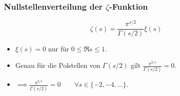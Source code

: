\begin{frame}[label=current]
    \frametitle{Nullstellenverteilung der $\zeta$-Funktion}
    \[
        \zeta(s) = \frac{\pi^{s/2}}{\Gamma(s/2)}\xi(s)  
    \]
    \begin{itemize}
        \item<2-> $\xi(s) = 0$ nur für $0 \leq \Re s \leq 1$.
        \item<3-> Genau für die Polstellen von $\Gamma(s/2)$ gilt $\frac{\pi^{2/s}}{\Gamma(s/2)} = 0$.
        \item<4-> $\implies \frac{\pi^{2/s}}{\Gamma(s/2)} = 0\qquad \forall s \in \{-2, -4, \dots\}$.
    \end{itemize}
\end{frame}